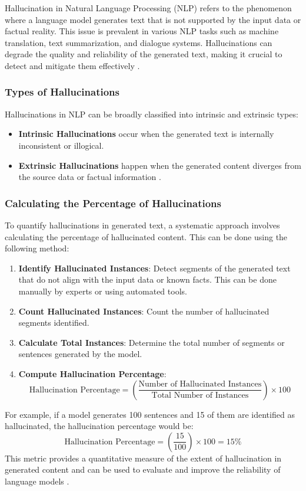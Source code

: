 Hallucination in Natural Language Processing (NLP) refers to the phenomenon where a language model generates text that is not supported by the input data or factual reality. This issue is prevalent in various NLP tasks such as machine translation, text summarization, and dialogue systems. Hallucinations can degrade the quality and reliability of the generated text, making it crucial to detect and mitigate them effectively \cite{Ji2022Survey}.

\subsubsection*{Types of Hallucinations}

Hallucinations in NLP can be broadly classified into intrinsic and extrinsic types:
\begin{itemize}
    \item \textbf{Intrinsic Hallucinations} occur when the generated text is internally inconsistent or illogical.
    \item \textbf{Extrinsic Hallucinations} happen when the generated content diverges from the source data or factual information \cite{Huang2023A}.
\end{itemize}

\subsubsection*{Calculating the Percentage of Hallucinations}

To quantify hallucinations in generated text, a systematic approach involves calculating the percentage of hallucinated content. This can be done using the following method:
\begin{enumerate}
    \item \textbf{Identify Hallucinated Instances}: Detect segments of the generated text that do not align with the input data or known facts. This can be done manually by experts or using automated tools.
    \item \textbf{Count Hallucinated Instances}: Count the number of hallucinated segments identified.
    \item \textbf{Calculate Total Instances}: Determine the total number of segments or sentences generated by the model.
    \item \textbf{Compute Hallucination Percentage}:
    \[
    \text{Hallucination Percentage} = \left( \frac{\text{Number of Hallucinated Instances}}{\text{Total Number of Instances}} \right) \times 100
    \]
\end{enumerate}
For example, if a model generates 100 sentences and 15 of them are identified as hallucinated, the hallucination percentage would be:
\[
\text{Hallucination Percentage} = \left( \frac{15}{100} \right) \times 100 = 15\%
\]
This metric provides a quantitative measure of the extent of hallucination in generated content and can be used to evaluate and improve the reliability of language models \cite{Xiao2021On}.
